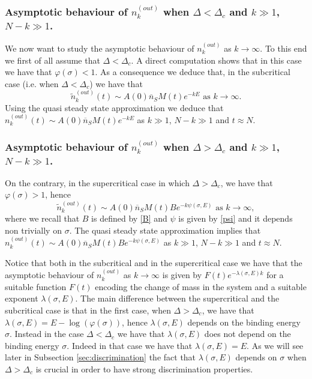 \documentclass{article}
\numberwithin{equation}{section}
\theoremstyle{plain}
\begin{document}
\subsubsection{Asymptotic behaviour of $n_k^{(out)}$ when $\Delta < \Delta_c$ and $k \gg 1 $, $N-k \gg 1 $.}
We now want to study the asymptotic behaviour of $n_k^{(out)} $ as $k  \to \infty $. 
To this end we first of all assume that $\Delta < \Delta_c$. 
A direct computation shows that in this case we have that $\varphi(\sigma) < 1$. As a consequence we deduce that, in the subcritical case (i.e. when $\Delta < \Delta_c$) we have that
 \begin{equation} \label{k large N-k large delta small}
\tilde{n}_k^{(out)} (t) \sim A(0) \overline n_S  M(t)  e^{- k E } \text{ as } k \to \infty. 
\end{equation}
Using the quasi steady state approximation we deduce that 
$
n_k^{(out)} (t) \sim  A(0) \overline n_S  M(t)  e^{- k E } $  as $ k \gg 1 $, $N- k \gg 1$ and $ t \approx N $. 

\subsubsection{Asymptotic behaviour of $n_k^{(out)}$ when $\Delta > \Delta_c$ and $k \gg 1 $, $N-k \gg 1 $.}
 On the contrary, in the supercritical case in which $\Delta > \Delta_c $, we have that $\varphi(\sigma) > 1$, hence 
 \begin{equation} \label{k large N-k large delta large}
  \tilde{n}_k^{(out)} (t)  \sim A(0)  \overline n_S  M(t)  B e^{ - k \psi(\sigma, E) }  \text{ as } k \to \infty,
 \end{equation}
 where we recall that $B$ is defined by \eqref{B} and $\psi $ is given by \eqref{psi} and it depends non trivially on $\sigma$. The quasi steady state approximation implies that  $ n_k^{(out)} (t)  \sim A(0)  \overline n_S  M(t)  B e^{ - k \psi(\sigma, E) }  $ as $k \gg 1 $, $N-k \gg 1 $ and $t \approx N $. 
 
Notice that both in the subcritical and in the supercritical case we have that the asymptotic behaviour of $n_k^{(out)} $ as $k \to \infty $ is given by $F(t) e^{- \lambda (\sigma , E) k } $ for a suitable function $F(t)$ encoding the change of mass in the system and a suitable exponent $\lambda(\sigma, E )$. 
The main difference between the supercritical and the subcritical case is that in the first case, when $\Delta > \Delta_c$, we have that $\lambda(\sigma, E ) =  E- \log(\varphi(\sigma ) )  $, hence $\lambda (\sigma, E) $ depends on the binding energy $\sigma $. Instead in the case $\Delta < \Delta_c$ we have that $\lambda(\sigma, E) $ does not depend on the binding energy $\sigma$. Indeed in that case we have that $\lambda(\sigma, E) =  E$. As we will see later in Subsection \ref{sec:discrimination} the fact that $\lambda(\sigma, E)$  depends on $\sigma $ when $\Delta > \Delta_c$ is crucial in order to have strong discrimination properties.  
\end{document}
